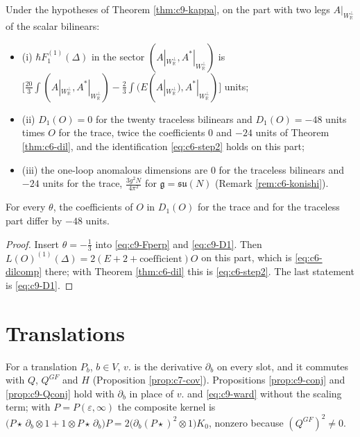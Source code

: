 \begin{corollary}
\label{cor:c9-ident}
Under the hypotheses of Theorem \ref{thm:c9-kappa}, on the part with two legs $A|_{W_{\mathbb R}^\perp}$ of the scalar bilinears:
\begin{itemize}
\item (i) $\hbar F_1^{(1)}(\Delta)$ in the sector $(A|_{W_{\mathbb R}^\perp},A^*|_{W_{\mathbb R}^\perp})$ is $\big[\tfrac{20}3\int(A|_{W_{\mathbb R}^\perp},A^*|_{W_{\mathbb R}^\perp})-\tfrac23\int(E(A|_{W_{\mathbb R}^\perp}),A^*|_{W_{\mathbb R}^\perp})\big]$ units;
\item (ii) $D_1(O)=0$ for the twenty traceless bilinears and $D_1(O)=-48$ units times $O$ for the trace, twice the coefficients $0$ and $-24$ units of Theorem \ref{thm:c6-dil}, and the identification \eqref{eq:c6-step2} holds on this part;
\item (iii) the one-loop anomalous dimensions are $0$ for the traceless bilinears and $-24$ units for the trace, $\tfrac{3g^2N}{4\pi^2}$ for $\mathfrak g=\mathfrak{su}(N)$ (Remark \ref{rem:c6-konishi}).
\end{itemize}
For every $\theta$, the coefficients of $O$ in $D_1(O)$ for the trace and for the traceless part differ by $-48$ units.
\end{corollary}

\begin{proof}
Insert $\theta=-\tfrac13$ into \eqref{eq:c9-Fperp} and \eqref{eq:c9-D1}. Then $L(O)^{(1)}(\Delta)=2(E+2+\text{coefficient})O$ on this part, which is \eqref{eq:c6-dilcomp} there; with Theorem \ref{thm:c6-dil} this is \eqref{eq:c6-step2}. The last statement is \eqref{eq:c9-D1}.
\end{proof}

\section{Translations}

For a translation $P_b$, $b\in V$, $v.$ is the derivative $\partial_b$ on every slot, and it commutes with $Q$, $Q^{GF}$ and $H$ (Proposition \ref{prop:c7-cov}). Propositions \ref{prop:c9-conj} and \ref{prop:c9-Qconj} hold with $\partial_b$ in place of $v.$ and \eqref{eq:c9-ward} without the scaling term; with $P=P(\varepsilon,\infty)$ the composite kernel is $\big(P\star\,\partial_b\otimes1+1\otimes P\star\,\partial_b\big)P=2\big(\partial_b(P\star)^2\otimes1\big)K_0$, nonzero because $(Q^{GF})^2\neq0$.

